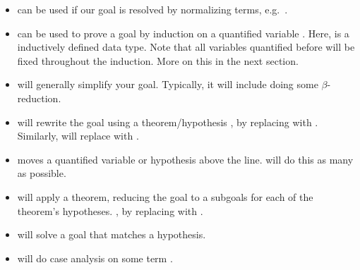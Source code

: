 \documentclass[class=scrartcl]{standalone}
\begin{document}
\begin{itemize}
  \item {} can be used if our goal
        is resolved by normalizing terms,
        e.g.\ .
  \item {} can be used to prove a goal
        by induction on a quantified variable .
        Here,  is a inductively defined data type.
        Note that all variables quantified before 
        will be fixed throughout the induction.
        More on this in the next section.
  \item {} will generally simplify your goal.
        Typically, it will include doing some \(\beta\)-reduction.
  \item {} will rewrite the goal using a theorem/hypothesis
        , by replacing  with . %
        Similarly,  will replace  with .
  \item {} moves a quantified variable or hypothesis above the line.
         will do this as many as possible.
  \item {} will apply a theorem,
        reducing the goal to a subgoals
        for each of the theorem's hypotheses.
        , by replacing  with . %
  \item {} will solve a goal that matches a hypothesis.
  \item {} will do case analysis on some term .
\end{itemize}
\end{document}
